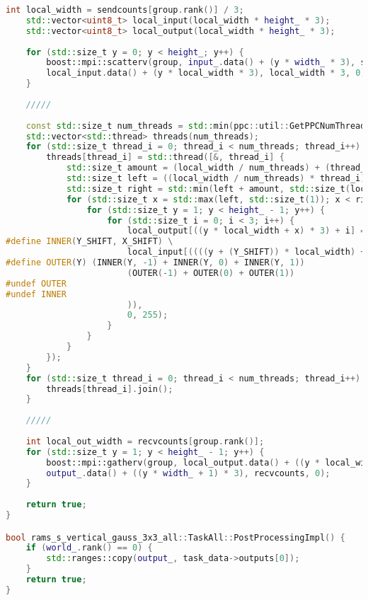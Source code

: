 \documentclass[12pt]{article}
\begin{document}
\begin{lstlisting}[language=C++]
	int local_width = sendcounts[group.rank()] / 3;
	std::vector<uint8_t> local_input(local_width * height_ * 3);
	std::vector<uint8_t> local_output(local_width * height_ * 3);
	
	for (std::size_t y = 0; y < height_; y++) {
		boost::mpi::scatterv(group, input_.data() + (y * width_ * 3), sendcounts, displs,
		local_input.data() + (y * local_width * 3), local_width * 3, 0);
	}
	
	/////
	
	const std::size_t num_threads = std::min(ppc::util::GetPPCNumThreads(), local_width);
	std::vector<std::thread> threads(num_threads);
	for (std::size_t thread_i = 0; thread_i < num_threads; thread_i++) {
		threads[thread_i] = std::thread([&, thread_i] {
			std::size_t amount = (local_width / num_threads) + (thread_i < local_width % num_threads ? 1 : 0);
			std::size_t left = ((local_width / num_threads) * thread_i) + std::min(local_width % num_threads, thread_i);
			std::size_t right = std::min(left + amount, std::size_t(local_width) - 1);
			for (std::size_t x = std::max(left, std::size_t(1)); x < right; x++) {
				for (std::size_t y = 1; y < height_ - 1; y++) {
					for (std::size_t i = 0; i < 3; i++) {
						local_output[((y * local_width + x) * 3) + i] = std::clamp(static_cast<int>(std::round(
#define INNER(Y_SHIFT, X_SHIFT) \
						local_input[((((y + (Y_SHIFT)) * local_width) + x + (X_SHIFT)) * 3) + i] * kernel_[4 + (3 * (Y_SHIFT)) + (X_SHIFT)]
#define OUTER(Y) (INNER(Y, -1) + INNER(Y, 0) + INNER(Y, 1))
						(OUTER(-1) + OUTER(0) + OUTER(1))
#undef OUTER
#undef INNER
						)),
						0, 255);
					}
				}
			}
		});
	}
	for (std::size_t thread_i = 0; thread_i < num_threads; thread_i++) {
		threads[thread_i].join();
	}
	
	/////
	
	int local_out_width = recvcounts[group.rank()];
	for (std::size_t y = 1; y < height_ - 1; y++) {
		boost::mpi::gatherv(group, local_output.data() + ((y * local_width + 1) * 3), local_out_width,
		output_.data() + ((y * width_ + 1) * 3), recvcounts, 0);
	}
	
	return true;
}

bool rams_s_vertical_gauss_3x3_all::TaskAll::PostProcessingImpl() {
	if (world_.rank() == 0) {
		std::ranges::copy(output_, task_data->outputs[0]);
	}
	return true;
}
\end{lstlisting}
\end{document}
